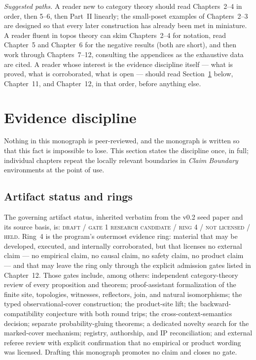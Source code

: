 \emph{Suggested paths.} A reader new to category theory should read
Chapters~2--4 in order, then 5--6, then Part~II linearly; the small-poset
examples of Chapters~2--3 are designed so that every later construction has
already been met in miniature. A reader fluent in topos theory can skim
Chapters~2--4 for notation, read Chapter~5 and Chapter~6 for the negative
results (both are short), and then work through Chapters~7--12, consulting
the appendices as the exhaustive data are cited. A reader whose interest is
the evidence discipline itself --- what is proved, what is corroborated,
what is open --- should read Section~\ref{ch01:sec:evidence} below,
Chapter~11, and Chapter~12, in that order, before anything else.

\section{Evidence discipline}\label{ch01:sec:evidence}

Nothing in this monograph is peer-reviewed, and the monograph is written so
that this fact is impossible to lose. This section states the discipline
once, in full; individual chapters repeat the locally relevant boundaries in
\emph{Claim Boundary} environments at the point of use.

\subsection{Artifact status and rings}\label{ch01:sec:rings}

The governing artifact status, inherited verbatim from the v0.2 seed paper
and its source basis, is: \textsc{draft / gate 1 research candidate /
ring 4 / not licensed / held}. Ring~4 is the program's outermost evidence
ring: material that may be developed, executed, and internally corroborated,
but that licenses no external claim --- no empirical claim, no causal claim,
no safety claim, no product claim --- and that may leave the ring only
through the explicit admission gates listed in Chapter~12. Those gates
include, among others: independent category-theory review of every
proposition and theorem; proof-assistant formalization of the finite site,
topologies, witnesses, reflectors, join, and natural isomorphisms; the
typed observational-cover construction; the product-site lift; the
backward-compatibility conjecture with both round trips; the
cross-context-semantics decision; separate probability-gluing theorems; a
dedicated novelty search for the marked-cover mechanism; registry,
authorship, and IP reconciliation; and external referee review with
explicit confirmation that no empirical or product wording was licensed.
Drafting this monograph promotes no claim and closes no gate.

